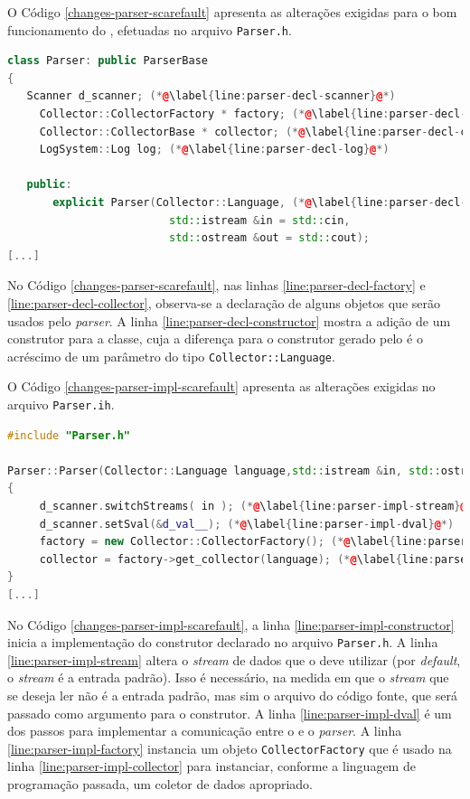 O Código \ref{changes-parser-scarefault} apresenta as alterações exigidas para
o bom funcionamento do \scarefault, efetuadas no arquivo \lstinline|Parser.h|. 

\begin{lstlisting}[language=C++, label=changes-parser-scarefault, caption=Alterações no arquivo \lstinline|Parser.h| para uso do scarefault]
class Parser: public ParserBase
{
   Scanner d_scanner; (*@\label{line:parser-decl-scanner}@*)
	 Collector::CollectorFactory * factory; (*@\label{line:parser-decl-factory}@*)
	 Collector::CollectorBase * collector; (*@\label{line:parser-decl-collector}@*)
	 LogSystem::Log log; (*@\label{line:parser-decl-log}@*)
        
   public:
	   explicit Parser(Collector::Language, (*@\label{line:parser-decl-constructor}@*)
		                 std::istream &in = std::cin,
		                 std::ostream &out = std::cout);
[...]
\end{lstlisting}

No Código \ref{changes-parser-scarefault}, nas linhas
\ref{line:parser-decl-factory} e \ref{line:parser-decl-collector}, observa-se
a declaração de alguns objetos que serão usados pelo \textit{parser}. A linha
\ref{line:parser-decl-constructor} mostra a adição de um construtor para a
classe, cuja a diferença para o construtor gerado pelo \bisoncpp é o acréscimo
de um parâmetro do tipo \lstinline|Collector::Language|.

O Código \ref{changes-parser-impl-scarefault} apresenta as alterações exigidas
no arquivo \lstinline|Parser.ih|.

\begin{lstlisting}[language=C++, label=changes-parser-impl-scarefault, caption=Alterações no \lstinline|Parser.ih| para uso do \scarefault]
#include "Parser.h"

Parser::Parser(Collector::Language language,std::istream &in, std::ostream &out) (*@\label{line:parser-impl-constructor}@*)
{
	 d_scanner.switchStreams( in ); (*@\label{line:parser-impl-stream}@*)
	 d_scanner.setSval(&d_val__); (*@\label{line:parser-impl-dval}@*)
	 factory = new Collector::CollectorFactory(); (*@\label{line:parser-impl-factory}@*)
	 collector = factory->get_collector(language); (*@\label{line:parser-impl-collector}@*)
}
[...]
\end{lstlisting}

No Código \ref{changes-parser-impl-scarefault}, a linha \ref{line:parser-impl-constructor}
inicia a implementação do construtor declarado no arquivo \lstinline|Parser.h|.
A linha \ref{line:parser-impl-stream} altera o \textit{stream} de dados que
o \parser deve utilizar (por \textit{default}, o \textit{stream} é a entrada
padrão). Isso é necessário, na medida em que o \textit{stream} que se deseja
ler não é a entrada padrão, mas sim o arquivo do código fonte, que será
passado como argumento para o construtor. A linha
\ref{line:parser-impl-dval} é um dos passos para implementar a comunicação
entre o \scanner e o \textit{parser}. A linha \ref{line:parser-impl-factory}
instancia um objeto \lstinline|CollectorFactory| que é usado na linha
\ref{line:parser-impl-collector} para instanciar, conforme a linguagem de
programação passada, um coletor de dados apropriado.

